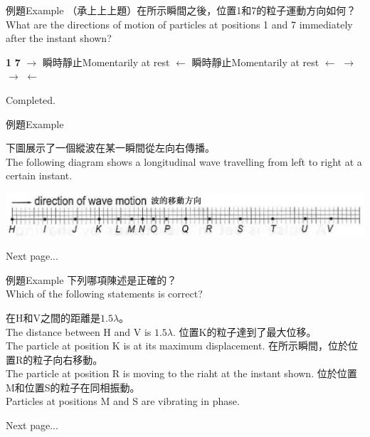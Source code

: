 \documentclass[beamer=true]{standalone}
\begin{document}
\begin{frame}[t]{例題Example}
    （承上上上題）在所示瞬間之後，位置1和7的粒子運動方向如何？\\What are the directions of motion of particles at positions 1 and 7 immediately after the instant shown?
    \begin{tasks}
        \task [] \textbf{1} \dtab \textbf{7}
        \task $\rightarrow $ \dtab 瞬時靜止Momentarily at rest
        \task $\leftarrow $ \dtab 瞬時靜止Momentarily at rest
        \task $\leftarrow $ \dtab $\rightarrow $
        \task $\rightarrow $ \dtab $\leftarrow $
    \end{tasks}
    \vfill\raggedleft Completed.
\end{frame}



\begin{frame}[t]{例題Example}

    下圖展示了一個縱波在某一瞬間從左向右傳播。\\The following diagram shows a longitudinal wave travelling from left to right at a certain instant.
    \par{\par\centering\includegraphics[width=.9\textwidth]{./img/ch1b_2024-05-17-12-25-33.png}\par}
    \raggedleft Next page...
\end{frame}

\begin{frame}[t]{例題Example}
    下列哪項陳述是正確的？\\Which of the following statements is correct?
    \begin{tasks}
        \task 在H和V之間的距離是$1.5\lambda$。\\The distance between H and V is $1.5\lambda$.
        \task 位置K的粒子達到了最大位移。\\The particle at position K is at its maximum displacement.
        \task 在所示瞬間，位於位置R的粒子向右移動。\\The particle at position R is moving to the riaht at the instant shown.
        \task 位於位置M和位置S的粒子在同相振動。\\Particles at positions M and S are vibrating in phase.
    \end{tasks}
    \raggedleft Next page...
\end{frame}
\end{document}

